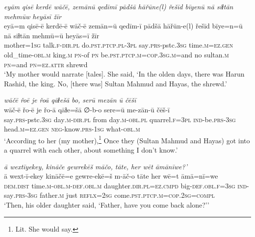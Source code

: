 \ea \label{ŽH.2}
\textit{eyām qisē kerdē wāčē, zemānū qedīmī pādšā hāřūne(l) řešīd bīyenū nā siɫtān mehmūw heyāsī žīr} \\ 
\gll eyā=m qisē-ē kerdē-ē wāč-ē zemān=ū qedīm-ī pādšā hāřūn-e(l) řešīd bīye=n=ū nā siɫtān mehmū=ū heyās=ī žīr \\ 
 mother\textsc{=1sg} talk\textsc{\textsc{.f}}\textsc{-dir}\textsc{.pl} do\textsc{.pst}\textsc{.ptcp}\textsc{.pl}\textsc{-3pl} say\textsc{.prs-}pstc\textsc{.3sg} time\textsc{.m}\textsc{=ez}\textsc{.gen} old\_time\textsc{-obl}\textsc{.m} king\textsc{.m} \textsc{pn}-of \textsc{pn} be\textsc{.pst}\textsc{.ptcp}\textsc{.m}\textsc{=cop}\textsc{.3sg}\textsc{.m}=and no sultan\textsc{.m} \textsc{pn}=and \textsc{pn}\textsc{=ez}.\textsc{attr} shrewd \\ 
\glt `My mother would narrate [tales]. She said, ‘In the olden days, there was Harun Rashid, the king. No, [there was] Sultan Mahmud and Hayas, the shrewd.'
\z 
 
\ea \label{ŽH.3}
\textit{wāčē řoē je řoā qāɫešā bo, serū mezān ū čēšī} \\ 
\gll wāč-ē řo-ē je řo-ā qāɫe=šā ∅-b-o sere=ū me-zān-ū čēš-ī \\ 
 say\textsc{.prs-}pstc\textsc{.3sg} day\textsc{.m}\textsc{-dir}\textsc{.pl} from day\textsc{.m}\textsc{-obl}\textsc{.pl} quarrel\textsc{\textsc{.f}}\textsc{=3pl} \textsc{ind-}be\textsc{.prs}\textsc{-3sg} head\textsc{.m}\textsc{=ez}\textsc{.gen} \textsc{neg-}know\textsc{.prs}\textsc{-1sg} what\textsc{-obl}\textsc{.m} \\ 
\glt `According to her (my mother),\footnote{Lit. She would say.}  Once they (Sultan Mahmud and Hayas) got into a quarrel with each other, about something I don’t know.'
\z 
 
\ea \label{ŽH.22}
\textit{ā wextīyekey, kināče gewrekēš māčo, tāte, her wēt āmānīwe?’} \\ 
\gll ā wext-ī-ekey kināčē=e gewre-ekē=š m-āč-o tāte her wē=t āmā=nī=we \\ 
 \textsc{dem.dist} time\textsc{.m}\textsc{-obl}\textsc{.m}\textsc{-def}\textsc{.obl}\textsc{.m} daughter\textsc{.dir}\textsc{.pl}\textsc{=ez}\textsc{.cmpd} big\textsc{-def}\textsc{.obl}\textsc{\textsc{.f}}\textsc{=3sg} \textsc{ind-}say\textsc{.prs}\textsc{-3sg} father\textsc{.m} just \textsc{reflx}\textsc{=\textsc{2sg}} come\textsc{.pst}\textsc{.ptcp}\textsc{.m}\textsc{=cop}\textsc{.\textsc{2sg}}\textsc{=compl} \\ 
\glt `Then, his older daughter said, ‘Father, have you come back alone?’'
\z 
 
